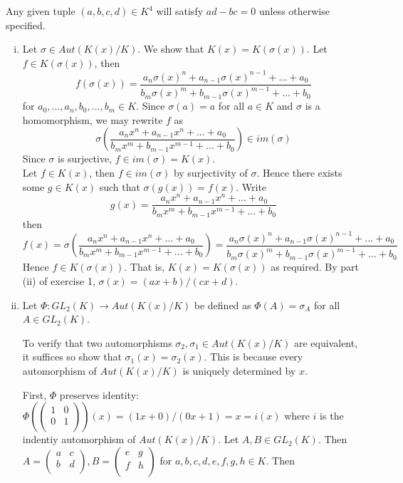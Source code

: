 \begin{solution} 
Any given tuple $(a,b,c,d) \in K^4$ will satisfy $ad - bc = 0$ 
unless otherwise specified.



\begin{enumerate}[(i)]

\item Let $\sigma \in Aut(K(x)/K)$. We show that $K(x) = K(\sigma(x)) $. 
Let $f \in K(\sigma(x))$, then 
$$
f(\sigma(x)) = \frac{a_n\sigma(x)^n + a_{n-1}\sigma(x)^{n-1} + ... + a_0 }{b_m\sigma(x)^m + b_{m-1}\sigma(x)^{m-1} + ... + b_0 } 
$$ 
for $a_0,...,a_n,b_0,...,b_m \in K$. Since $\sigma(a) = a $ 
for all $a \in K$ and $\sigma$ is a homomorphism, we may 
rewrite $f$ as $$\sigma (\frac{a_nx^n + a_{n-1}x^n + ... + a _0}{b_mx^m + b_{m-1}x^{m-1} + ... + b_0}) \in im(\sigma)$$ 
Since $\sigma$ is surjective, $f \in im(\sigma) = K(x)$. \\

Let $f \in K(x)$, then $f \in im(\sigma)$ by surjectivity of $\sigma$. 
Hence there exists some $g\in K(x)$ such that $\sigma(g(x)) = f(x)$.
Write $$g(x) = \frac{a_nx^n + a_{n-1}x^n + ... + a _0}{b_mx^m + b_{m-1}x^{m-1} + ... + b_0}$$ 
then $$
f(x)= \sigma(\frac{a_nx^n + a_{n-1}x^n + ... + a _0}{b_mx^m + b_{m-1}x^{m-1} + ... + b_0}) 
= \frac{a_n\sigma(x)^n + a_{n-1}\sigma(x)^{n-1} + ... + a_0 }{b_m\sigma(x)^m + b_{m-1}\sigma(x)^{m-1} + ... + b_0 } 
$$ 
Hence $f \in K(\sigma(x))$. That is, $K(x) = K(\sigma(x))$ as required.
By part (ii) of exercise 1, $\sigma(x) = (ax+b)/(cx+d)$.


\item Let $\Phi : GL_2(K) \longrightarrow Aut(K(x)/K) $ be defined as
$\Phi (A) = \sigma_A $ for all $A \in GL_2(K)$. 
\begin{remark}
To verify that two automorphisms $\sigma_2,\sigma_1 \in Aut(K(x)/K)$ 
are equivalent, it suffices so show that $\sigma_1(x)=\sigma_2(x)$. 
This is because every automorphism of $Aut(K(x)/K)$ is uniquely 
determined by $x$. 
\end{remark}
First, $\Phi$ preserves
identity: $\Phi(\begin{pmatrix} 1 & 0 \\ 0 & 1 \\ \end{pmatrix})(x) = (1x + 0)/(0x +1) = x = i(x)$
where $i$ is the indentiy automorphism of $Aut(K(x)/K)$. Let $A,B \in GL_2(K)$.
Then $A = \begin{pmatrix} a & c \\ b & d \\ \end{pmatrix} , B = \begin{pmatrix} e & g \\ f & h \\ \end{pmatrix} $ 
for $a,b,c,d,e,f,g,h \in K$. Then


\end{enumerate}
\end{solution}
